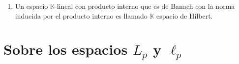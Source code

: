 \documentclass[twoside,12pt,a4 paper,openright]{book}
\begin{document}
\begin{enumerate}
\item Un espacio $\mathbb K$-lineal con producto interno que es de Banach con la norma inducida por el producto interno es llamado $\mathbb K$ espacio de Hilbert.

 


 



\end{enumerate}

\newcommand{\abs}[1]{\ensuremath{\left|#1\right|}}


\section{Sobre los espacios $L_p$ y $\ell_p$}
\end{document}
